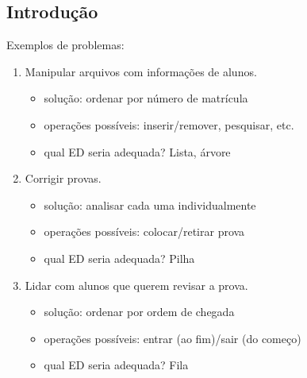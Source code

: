 \subsection{Introdução}
\begin{frame}
	Exemplos de problemas:
	\begin{enumerate}
		\item Manipular arquivos com informações de alunos. \pause
			\begin{itemize}
				\item solução: ordenar por número de matrícula
				\item operações possíveis: inserir/remover, pesquisar, etc.
				\item qual ED seria adequada? \pause \alert<3>{Lista, árvore}
			\end{itemize}
		\pause
		\item Corrigir provas. \pause
			\begin{itemize}
				\item solução: analisar cada uma individualmente
				\item operações possíveis: colocar/retirar prova
				\item qual ED seria adequada? \pause \alert<6>{Pilha}
			\end{itemize}
		\pause
		\item Lidar com alunos que querem revisar a prova. \pause
			\begin{itemize}
				\item solução: ordenar por ordem de chegada
				\item operações possíveis: entrar (ao fim)/sair (do começo)
				\item qual ED seria adequada? \pause \alert<9>{Fila}
			\end{itemize}
	\end{enumerate}
\end{frame}

